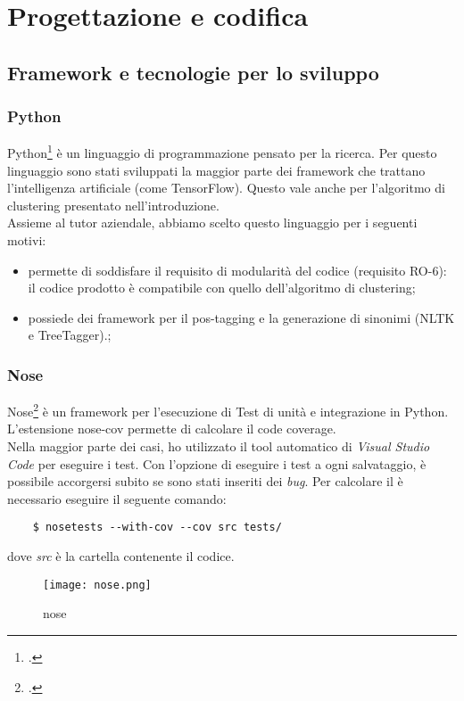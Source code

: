 
\chapter{Progettazione e codifica}
\label{cap:progettazione-codifica}

\section{Framework e tecnologie per lo sviluppo}
\label{sec:framework}
\subsection*{Python}
Python\footcite{site:python} è un linguaggio di programmazione pensato per la ricerca. Per questo linguaggio sono stati sviluppati la maggior parte dei framework che trattano l'intelligenza artificiale (come TensorFlow). Questo vale anche per l'algoritmo di clustering presentato nell'introduzione.\\
Assieme al tutor aziendale, abbiamo scelto questo linguaggio per i seguenti motivi:
\begin{itemize}
    \item permette di soddisfare il requisito di modularità del codice (requisito RO-6): il codice prodotto è compatibile con quello dell'algoritmo di clustering;
    \item possiede dei framework per il pos-tagging e la generazione di sinonimi (NLTK e TreeTagger).;
\end{itemize}

\subsection*{Nose}
Nose\footcite{site:nose} è un framework per l'esecuzione di Test di unità e integrazione in Python. L'estensione nose-cov permette di calcolare il code coverage.\\
Nella maggior parte dei casi, ho utilizzato il tool automatico di \textit{Visual Studio Code} per eseguire i test. Con l'opzione di eseguire i test a ogni salvataggio, è possibile accorgersi subito se sono stati inseriti dei \textit{bug}.
Per calcolare il  è necessario eseguire il seguente comando:
\begin{lstlisting}
    $ nosetests --with-cov --cov src tests/
\end{lstlisting}
dove \textit{src} è la cartella contenente il codice.
\begin{figure}[H]
    \centering
    \texttt{[image: nose.png]} 
    \caption{nose}
    \label{logo:nose}
\end{figure}    
